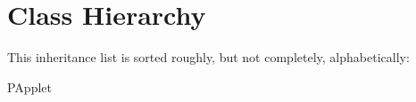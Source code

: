 \section{Class Hierarchy}
This inheritance list is sorted roughly, but not completely, alphabetically\+:\begin{DoxyCompactList}
\item P\+Applet\begin{DoxyCompactList}
\item {}
\end{DoxyCompactList}
\end{DoxyCompactList}
